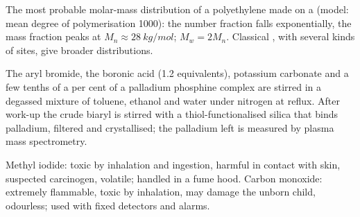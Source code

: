 \begin{omfigure}

{\small The most probable molar-mass distribution of a polyethylene made on a
 (model: mean degree of polymerisation 1000): the number
fraction falls exponentially, the mass fraction peaks at $M_n \approx \qty{28}{kg/mol}$; $M_w = 2M_n$. Classical
, with several kinds of sites, give broader
distributions.}
\end{omfigure}

\begin{inthelab}
The aryl bromide, the boronic acid (1.2 equivalents), potassium carbonate and a
few tenths of a per cent of a palladium phosphine complex are stirred in a
degassed mixture of toluene, ethanol and water under nitrogen at reflux. After
work-up the crude biaryl is stirred with a thiol-functionalised silica that
binds palladium, filtered and crystallised; the palladium left is measured by
plasma mass spectrometry.
\end{inthelab}

\begin{safety}{}
Methyl iodide: toxic by inhalation and ingestion, harmful in contact with skin, suspected
carcinogen, volatile; handled in a fume hood. Carbon monoxide: extremely
flammable, toxic by inhalation, may damage the unborn child, odourless; used
with fixed detectors and alarms.
\end{safety}

